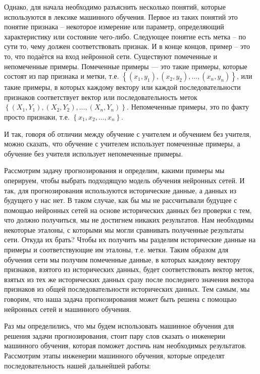{  \par \redline Однако, для начала необходимо разъяснить несколько понятий, которые используются в лексике машинного обучения. Первое из таких понятий это понятие признака – некоторое измерение или параметр, определяющий характеристику или состояние чего-либо. Следующее понятие есть метка – по сути то, чему должен соответствовать признак.  И в конце концов, пример – это то, что подаётся на вход нейронной сети. Существуют помеченные и непомеченные примеры. Помеченные примеры — это такие примеры, которые состоят из пар признака и метки, т.е. $\left\{\left(x_{1}, y_{1}\right), \left(x_{2}, y_{2}\right), \dots, \left(x_{n}, y_{n}\right)\right\}$, или такие примеры, в которых каждому вектору или каждой последовательности признаков соответствует вектор или последовательность меток $\left\{\left(X_{1}, Y_{1}\right), \left(X_{2}, Y_{2}\right), \dots, \left(X_{n}, Y_{n}\right)\right\}$. Непомеченные примеры, это по факту просто признаки, т.е. $\left\{x_{1}, x_{2}, \dots, x_{n}\right\}$. 

  \par \redline И так, говоря об отличии между обучение с учителем и обучением без учителя, можно сказать, что обучение с учителем использует помеченные примеры, а обучение без учителя использует непомеченные примеры. 

  \par \redline	Рассмотрим задачу прогнозирования и определим, какими примеры мы оперируем, чтобы выбрать подходящую модель обучения нейронных сетей. И так, для прогнозирования используются исторические данные, а данных из будущего у нас нет. В таком случае, как бы мы не рассчитывали будущее с помощью нейронных сетей на основе исторических данных без проверки с тем, что должно получиться, мы не достигнем никаких результатов. Нам необходимы некоторые эталоны, с которыми мы могли сравнивать полученные результаты сети. Откуда их брать? Чтобы их получить мы разделим исторические данные на примеры и соответствующие им эталоны, т.е. метки. Таким образом для обучения сети мы получим помеченные данные, в которых каждому вектору признаков, взятого из исторических данных, будет соответствовать вектор меток, взятых из тех же исторических данных сразу после последнего значения вектора признаков из общей последовательности исторических данных. Тем самым, мы говорим, что наша задача прогнозирования может быть решена с помощью нейронных сетей и машинного обучения.

  \par \redline Раз мы определились, что мы будем использовать машинное обучения для решения задачи прогнозирования, стоит пару слов сказать о инженерии машинного обучения, которая поможет достичь нам необходимых результатов. Рассмотрим этапы инженерии машинного обучения, которые определят последовательность нашей дальнейшей работы:

}
